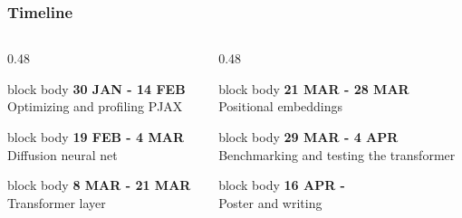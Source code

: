 \documentclass[t, xcolor=table, aspectratio=169]{beamer}
\begin{document}

    \begin{frame}
        \frametitle{Timeline}
        \vspace*{-1em}
        \begin{columns}[onlytextwidth,T]
            \begin{column}{0.48\textwidth}
                \begin{beamercolorbox}[wd=\textwidth, sep=0.5em, rounded=true, shadow=true]{block body}
                    \textbf{30 JAN - 14 FEB} \\ \scriptsize Optimizing and profiling PJAX
                \end{beamercolorbox}
                \vspace{0.5em}
                \begin{beamercolorbox}[wd=\textwidth, sep=0.5em, rounded=true, shadow=true]{block body}
                    \textbf{19 FEB - 4 MAR} \\ \scriptsize Diffusion neural net
                \end{beamercolorbox}
                \vspace{0.5em}
                \begin{beamercolorbox}[wd=\textwidth, sep=0.5em, rounded=true, shadow=true]{block body}
                    \textbf{8 MAR - 21 MAR} \\ \scriptsize Transformer layer
                \end{beamercolorbox}
            \end{column}
            
            \begin{column}{0.48\textwidth}
                \begin{beamercolorbox}[wd=\textwidth, sep=0.5em, rounded=true, shadow=true]{block body}
                    \textbf{21 MAR - 28 MAR} \\ \scriptsize Positional embeddings
                \end{beamercolorbox}
                \vspace{0.5em}
                \begin{beamercolorbox}[wd=\textwidth, sep=0.5em, rounded=true, shadow=true]{block body}
                    \textbf{29 MAR - 4 APR} \\ \scriptsize Benchmarking and testing the transformer
                \end{beamercolorbox}
                \vspace{0.5em}
                \begin{beamercolorbox}[wd=\textwidth, sep=0.5em, rounded=true, shadow=true]{block body}
                    \textbf{16 APR - } \\ \scriptsize Poster and writing
                \end{beamercolorbox}
            \end{column}
        \end{columns}
    \end{frame}
\end{document}
